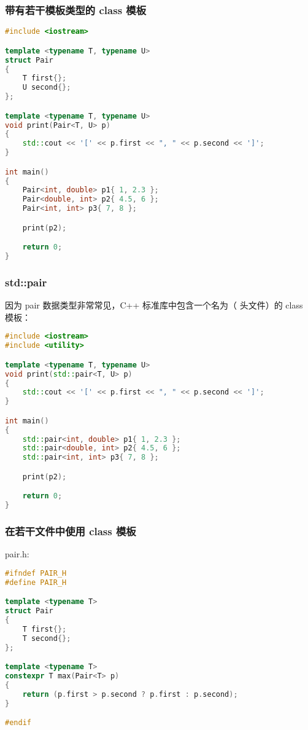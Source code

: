 \documentclass[../../LearnCpp.tex]{subfiles}
\begin{document}
\subsubsection*{带有若干模板类型的 class 模板}

\begin{lstlisting}[language=C++]
#include <iostream>

template <typename T, typename U>
struct Pair
{
    T first{};
    U second{};
};

template <typename T, typename U>
void print(Pair<T, U> p)
{
    std::cout << '[' << p.first << ", " << p.second << ']';
}

int main()
{
    Pair<int, double> p1{ 1, 2.3 };
    Pair<double, int> p2{ 4.5, 6 };
    Pair<int, int> p3{ 7, 8 };

    print(p2);

    return 0;
}
\end{lstlisting}

\subsubsection*{std::pair}

因为 pair 数据类型非常常见，C++ 标准库中包含一个名为（ 头文件）的 class 模板：

\begin{lstlisting}[language=C++]
#include <iostream>
#include <utility>

template <typename T, typename U>
void print(std::pair<T, U> p)
{
    std::cout << '[' << p.first << ", " << p.second << ']';
}

int main()
{
    std::pair<int, double> p1{ 1, 2.3 };
    std::pair<double, int> p2{ 4.5, 6 };
    std::pair<int, int> p3{ 7, 8 };

    print(p2);

    return 0;
}
\end{lstlisting}

\subsubsection*{在若干文件中使用 class 模板}

pair.h:

\begin{lstlisting}[language=C++]
#ifndef PAIR_H
#define PAIR_H

template <typename T>
struct Pair
{
    T first{};
    T second{};
};

template <typename T>
constexpr T max(Pair<T> p)
{
    return (p.first > p.second ? p.first : p.second);
}

#endif
\end{lstlisting}
\end{document}
